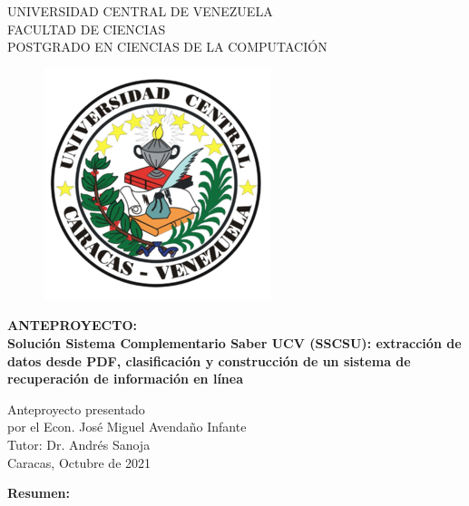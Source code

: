 
\begin{center}
	UNIVERSIDAD CENTRAL DE VENEZUELA\\
	FACULTAD DE CIENCIAS\\
	POSTGRADO EN CIENCIAS DE LA COMPUTACI\'ON\\

	\begin{figure}
						\centering
						  \includegraphics[height=.7\textwidth]{images/UCV.png}
  \end{figure}
  \vspace{1.5cm}
  \large{\textbf{ANTEPROYECTO:\\ Solución Sistema Complementario Saber UCV (SSCSU): extracción de datos desde PDF, clasificación y construcción de un sistema de recuperación de información en línea}}

  \vspace{3cm}
  Anteproyecto presentado  \\
  por el Econ. José Miguel Avendaño Infante\\
  Tutor: Dr. Andrés Sanoja\\
  \vspace{1.5cm}
  Caracas, Octubre de 2021
\end{center}






\setlength{\abovedisplayskip}{-5pt}
\setlength{\abovedisplayshortskip}{-5pt}
\thispagestyle{empty}

\thispagestyle{empty}

\newpage
\thispagestyle{empty}
\large{\textbf{Resumen:}}


